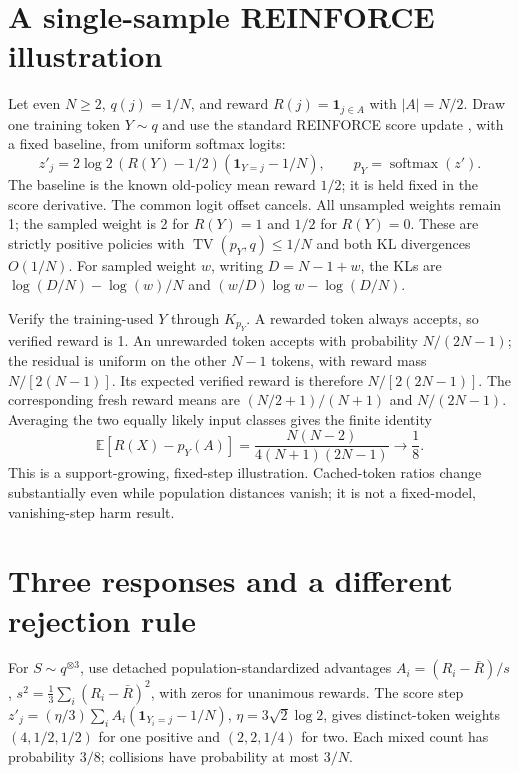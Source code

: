 \documentclass[10pt]{article}
\newcommand{\TV}{\operatorname{TV}}
\newcommand{\EE}{\mathbb E}
\begin{document}
\section{A single-sample REINFORCE illustration}
Let even $N\ge2$, $q(j)=1/N$, and reward $R(j)=\mathbf1_{j\in A}$ with $|A|=N/2$. Draw one training token $Y\sim q$ and use the standard REINFORCE score update \citep{williams1992}, with a fixed baseline, from uniform softmax logits:
\begin{equation}\label{eq:reinforce}
 z'_j=2\log2\,(R(Y)-1/2)(\mathbf1_{Y=j}-1/N),\qquad p_Y=\operatorname{softmax}(z').
\end{equation}
The baseline is the known old-policy mean reward $1/2$; it is held fixed in the score derivative. The common logit offset cancels. All unsampled weights remain 1; the sampled weight is 2 for $R(Y)=1$ and $1/2$ for $R(Y)=0$. These are strictly positive policies with $\TV(p_Y,q)\le1/N$ and both KL divergences $O(1/N)$. For sampled weight $w$, writing $D=N-1+w$, the KLs are $\log(D/N)-\log(w)/N$ and $(w/D)\log w-\log(D/N)$.

Verify the training-used $Y$ through $K_{p_Y}$. A rewarded token always accepts, so verified reward is 1. An unrewarded token accepts with probability $N/(2N-1)$; the residual is uniform on the other $N-1$ tokens, with reward mass $N/[2(N-1)]$. Its expected verified reward is therefore $N/[2(2N-1)]$. The corresponding fresh reward means are $(N/2+1)/(N+1)$ and $N/(2N-1)$. Averaging the two equally likely input classes gives the finite identity
\begin{equation}\label{eq:eighth}
 \EE[R(X)-p_Y(A)]=\frac{N(N-2)}{4(N+1)(2N-1)}\longrightarrow\frac18.
\end{equation}
This is a support-growing, fixed-step illustration. Cached-token ratios change substantially even while population distances vanish; it is not a fixed-model, vanishing-step harm result.

\section{Three responses and a different rejection rule}
For $S\sim q^{\otimes3}$, use detached population-standardized advantages $A_i=(R_i-\bar R)/s$, $s^2=\frac13\sum_i(R_i-\bar R)^2$, with zeros for unanimous rewards. The score step $z'_j=(\eta/3)\sum_iA_i(\mathbf1_{Y_i=j}-1/N)$, $\eta=3\sqrt2\log2$, gives distinct-token weights $(4,1/2,1/2)$ for one positive and $(2,2,1/4)$ for two. Each mixed count has probability $3/8$; collisions have probability at most $3/N$.
\end{document}

